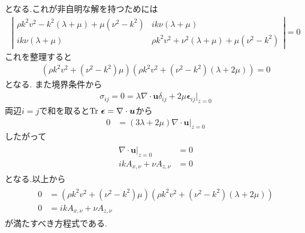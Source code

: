 \documentclass[uplatex,a4j,11pt,dvipdfmx]{jsarticle}
\begin{document}
となる.これが非自明な解を持つためには
\begin{align}
  \left|
    \begin{array}{cc}
    \rho k^2v^2-k^2(\lambda+\mu)+\mu(\nu^2-k^2)&ik\nu(\lambda+\mu)\\
    ik\nu(\lambda+\mu)&\rho k^2v^2+\nu^2(\lambda+\mu)+\mu(\nu^2-k^2)
  \end{array}
  \right|=0
\end{align}
これを整理すると
\begin{align}
  \left(\rho k^2v^2+(\nu^2-k^2)\mu\right)\left(\rho k^2v^2+(\nu^2-k^2)(\lambda+2\mu)\right)=0
\end{align}
となる.
また境界条件から
\begin{align}
  \sigma_{ij}=0=\lambda\nabla\cdot{\bm u}\delta_{ij}+2\mu{\bm \epsilon}_{ij}|_{z=0}
\end{align}
両辺$i=j$で和を取ると${\rm Tr}\ {\bm \epsilon}=\nabla\cdot{\bm u}$から
\begin{align}
    0&=(3\lambda+2\mu)\nabla\cdot{\bm u}|_{z=0}
\end{align}
したがって
\begin{align}
  \begin{split}
    \nabla\cdot{\bm u}|_{z=0}&=0\\
    ikA_{x,\nu}+\nu A_{z,\nu}&=0
  \end{split}
\end{align}
となる.以上から
\begin{align}
  \begin{split}
    0&=\left(\rho k^2v^2+(\nu^2-k^2)\mu\right)\left(\rho k^2v^2+(\nu^2-k^2)(\lambda+2\mu)\right)\\
    0&=ikA_{x,\nu}+\nu A_{z,\nu}
  \end{split}
\end{align}
が満たすべき方程式である.
\end{document}
